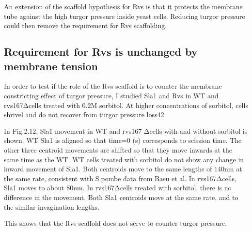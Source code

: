 An extension of the scaffold hypothesis for Rvs is that it protects the membrane tube against the high turgor pressure inside yeast cells. Reducing turgor pressure could then remove the requirement for Rvs scaffolding.

	\subsection{Requirement for Rvs is unchanged by membrane tension}
	In order to test if the role of the Rvs scaffold is to counter the membrane constricting effect of turgor pressure, I studied Sla1 and Rvs in WT and rvs167Δcells treated with 0.2M sorbitol. At higher concentrations of sorbitol, cells shrivel and do not recover from turgor pressure loss42.

In Fig.2.12, Sla1 movement in WT and rvs167 Δcells with and without sorbitol is shown. WT Sla1 is aligned so that time=0 (s) corresponds to scission time. The other three centroid movements are shifted so that they move inwards at the same time as the WT. WT cells treated with sorbitol do not show any change in inward movement of Sla1. Both centroids move to the same lengths of 140nm at the same rate, consistent with S.pombe data from Basu et al. In rvs167Δcells, Sla1 moves to about 80nm. In rvs167Δcells treated with sorbitol, there is no difference in the movement. Both Sla1 centroids move at the same rate, and to the similar invagination lengths.

This shows that the Rvs scaffold does not serve to counter turgor pressure.  


